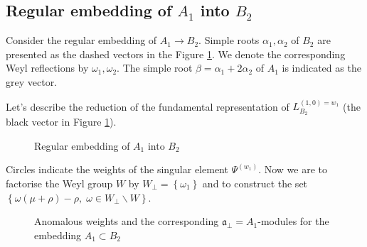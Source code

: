 \documentclass[12pt]{iopart}
\begin{document}
\subsection{Regular embedding of $A_1$ into $B_2$}
\label{sec:regul-embedd-a_1}

Consider the regular embedding of $A_1\to B_2$. Simple roots $\alpha_1, \alpha_2$ of $B_2$ are presented as the dashed vectors in the Figure \ref{fig:B2_A1}. We denote the corresponding Weyl reflections by $\omega_1, \omega_2$. The simple root $\beta = \alpha_1+2\alpha_2$ of $A_1$ is indicated as the grey vector.

Let's describe the reduction of the fundamental representation of $L^{(1,0)=w_1}_{B_2}$ (the black vector in Figure \ref{fig:B2_A1}).
\begin{figure}[th]
  \noindent{}
  \caption{Regular embedding of $A_1$ into $B_2$}
  \label{fig:B2_A1}
\end{figure}
Circles indicate the weights of the singular element $\Psi^{(w_1)}$.
Now we are to factorise the Weyl group $W$ by $W_{\bot}=\left\{\omega_1\right\}$ and to construct the set $\left\{\omega(\mu+\rho)-\rho,\; \omega\in W_{\bot}\backslash W\right\}$. 
\begin{figure}[t]
  \noindent{}
  \caption{Anomalous weights and the corresponding $\mathfrak{a}_{\bot}=A_1$-modules for the embedding $A_1\subset B_2$}
  \label{fig:B2_A1_2}
\end{figure}
\end{document}
